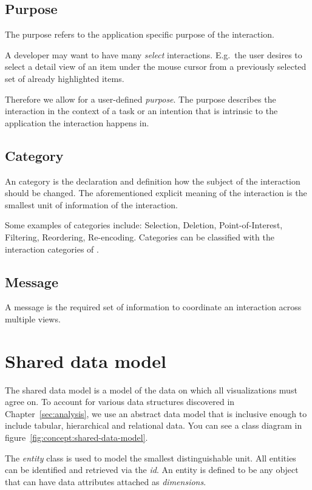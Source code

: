 \subsection{Purpose}
The purpose refers to the application specific purpose of the interaction.

A developer may want to have many \emph{select} interactions.
E.g.\ the user desires to select a detail view of an item under the mouse cursor from a previously selected set of already highlighted items.

Therefore we allow for a user-defined \emph{purpose}.
The purpose describes the interaction in the context of a task or an intention that is intrinsic to the application the interaction happens in.

\subsection{Category}
An category is the declaration and definition how the subject of the interaction should be changed.
The aforementioned explicit meaning of the interaction is the smallest unit of information of the interaction.

Some examples of categories include: Selection, Deletion, Point-of-Interest, Filtering, Reordering, Re-encoding.
Categories can be classified with the interaction categories of \textcite{Yi2007}.


\subsection{Message}
A message is the required set of information to coordinate an interaction across multiple views.

\section{Shared data model}\label{sec:concept:data-model}
The shared data model is a model of the data on which all visualizations must agree on.
To account for various data structures discovered in Chapter~\ref{sec:analysis}, we use an abstract data model that is inclusive enough to include tabular, hierarchical and relational data.
You can see a class diagram in figure~\ref{fig:concept:shared-data-model}.

The \emph{entity} class is used to model the smallest distinguishable unit.
All entities can be identified and retrieved via the \emph{id}.
An entity is defined to be any object that can have data attributes attached as \emph{dimensions}.

